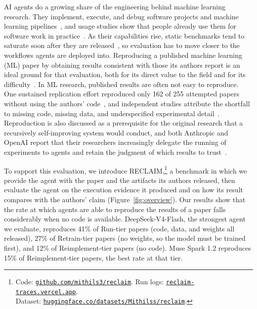 \documentclass{article} %
\renewcommand{\UrlFont}{\small\ttfamily}  %
\begin{document}
AI agents do a growing share of the engineering behind machine learning
research. They implement, execute, and debug software projects and machine
learning pipelines~\citep{jimenez2024swebench,chan2024mlebench,
merrill2026terminalbench}, and usage studies show that people already use them
for software work in practice~\citep{handa2025economic,huang2025aiwork,murphyhill2026adoption}. As their capabilities rise,
static benchmarks tend to saturate soon after they are
released~\citep{kiela2021dynabench,phan2025hle,ott2022mapping,akhtar2026plateau}, so evaluation has to move
closer to the workflows agents are deployed into. Reproducing a published machine learning (ML) paper by
obtaining results consistent with those its authors report is an ideal
ground for that evaluation, both for its direct value to the field and for
its difficulty~\citep{siegel2024corebench,starace2025paperbench}. In ML
research, published results are often not easy to reproduce. One sustained
replication effort reproduced only 162 of 255 attempted papers without
using the authors' code~\citep{raff2019step}, and independent studies
attribute the shortfall to missing code, missing data, and underspecified
experimental detail~\citep{gundersen2018state,henderson2018deep,
pineau2021improving,gundersen2022sources,gundersen2025unreasonable}. Reproduction is also
discussed as a prerequisite for the original research that a recursively
self-improving system would conduct, and both Anthropic and OpenAI report that
their researchers increasingly delegate the running of experiments to agents
and retain the judgment of which results to
trust~\citep{favaro2026recursive,openai2026acceleration}.

To support this evaluation, we introduce RECLAIM,\footnote{\renewcommand{\UrlFont}{\fontsize{8}{9}\selectfont\ttfamily}Code:
\textcolor{blue}{\href{https://github.com/mithils3/reclaim}{\nolinkurl{github.com/mithils3/reclaim}}}.
Run logs: \textcolor{blue}{\href{https://reclaim-traces.vercel.app}{\nolinkurl{reclaim-traces.vercel.app}}}.\\
Dataset: \textcolor{blue}{\href{https://huggingface.co/datasets/Mithilss/reclaim}{\nolinkurl{huggingface.co/datasets/Mithilss/reclaim}}}.\label{fn:artifacts}}
a benchmark in which we
provide the agent with the paper and the artifacts its authors released, then
evaluate the agent on the execution evidence it produced and on how its result
compares with the authors' claim (Figure~\ref{fig:overview}). Our results show that the rate at
which agents are able to reproduce the results of a paper falls considerably
when no code is available. DeepSeek-V4-Flash, the strongest agent we evaluate, reproduces
41\% of Run-tier papers (code, data, and weights all
released), 27\% of Retrain-tier papers (no weights, so the model must
be trained first), and 12\% of Reimplement-tier papers (no code). Muse Spark 1.2 reproduces 15\% of Reimplement-tier papers, the
best rate at that tier.
\end{document}
